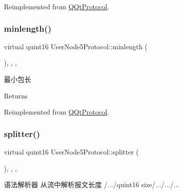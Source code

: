 Reimplemented from \mbox{\hyperlink{class_q_qt_protocol_af41bc3116abbbcfc9af45e151a253ff7}{Q\+Qt\+Protocol}}.

\mbox{\label{class_user_node5_protocol_a87f07fcef4add8b825ff6135600ca448}} 
\subsubsection{\texorpdfstring{minlength()}{minlength()}}
{\footnotesize\ttfamily virtual quint16 User\+Node5\+Protocol\+::minlength (\begin{DoxyParamCaption}{ }\end{DoxyParamCaption})\hspace{0.3cm}{\ttfamily [inline]}, {\ttfamily [override]}, {\ttfamily [protected]}, {\ttfamily [virtual]}}



最小包长 

\begin{DoxyReturn}{Returns}

\end{DoxyReturn}


Reimplemented from \mbox{\hyperlink{class_q_qt_protocol_a2b00f53d3dd0eed817eeecff422891f3}{Q\+Qt\+Protocol}}.

\mbox{\label{class_user_node5_protocol_a4e92b89d23b04291316291d1d949a075}} 
\subsubsection{\texorpdfstring{splitter()}{splitter()}}
{\footnotesize\ttfamily virtual quint16 User\+Node5\+Protocol\+::splitter (\begin{DoxyParamCaption}\item[{const Q\+Byte\+Array \&}]{ }\end{DoxyParamCaption})\hspace{0.3cm}{\ttfamily [inline]}, {\ttfamily [override]}, {\ttfamily [protected]}, {\ttfamily [virtual]}}



语法解析器 从流中解析报文长度 /.../quint16 size/.../.../... 


